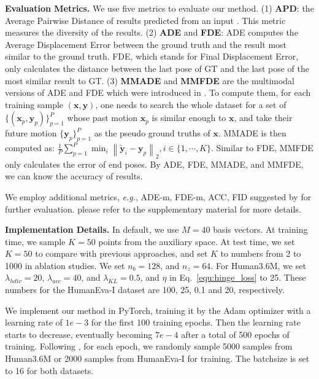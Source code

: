 \documentclass[sigconf,screen,nonacm]{acmart}
\begin{document}
	\textbf{Evaluation Metrics.} We use five metrics to evaluate our method. (1) \textbf{APD}: the Average Pairwise Distance of results predicted from an input \cite{aliakbarian2020stochastic}. This metric measures the diversity of the results. (2) \textbf{ADE} and \textbf{FDE}: ADE computes the Average Displacement Error between the ground truth and the result most similar to the ground truth. FDE, which stands for Final Displacement Error, only calculates the distance between the last pose of GT and the last pose of the most similar result to GT. (3) \textbf{MMADE} and \textbf{MMFDE} are the multimodal versions of ADE and FDE which were introduced in \cite{yuan2020dlow}. To compute them, for each training sample $(\mathbf{x},\mathbf{y})$, one needs to search the whole dataset for a set of $\{(\mathbf{x}_p,\mathbf{y}_p)\}_{p=1}^P$ whose past motion $\mathbf{x}_p$ is similar enough to $\mathbf{x}$, and take their future motion $\{\mathbf{y}_p\}_{p=1}^{P}$ as the pseudo ground truths of $\mathbf{x}$. MMADE is then computed as: $\frac{1}{P} \sum_{p=1}^{P} \min_{i} \left\|  \mathbf{\tilde{y}}_i - \mathbf{y}_p \right\|_2, i \in \{1, \cdots, K\}$. 
Similar to FDE, MMFDE only calculates the error of end poses. By ADE, FDE, MMADE, and MMFDE, we can know the accuracy of results.
	
We employ additional metrics, \textit{e.g.}, ADE-m, FDE-m, ACC, FID suggested by \cite{bie2022hit} for further evaluation. please refer to the supplementary material for more details.
	


	
	\textbf{Implementation Details.} 
In default, we use $M=40$ basis vectors. At training time, we sample $K=50$ points from the auxiliary space. At test time, we set $K=50$ to compare with previous approaches, and set $K$ to numbers from 2 to 1000 in ablation studies. We set $n_b = 128$, and $n_z = 64$. For Human3.6M, we set $\lambda_{hdiv} =20$, $\lambda_{acc}=40$, and $\lambda_{KL}=0.5$, and $\eta$ in Eq.~\ref{equ:hinge_loss} to 25. These numbers for the HumanEva-I dataset are 100, 25, 0.1 and 20, respectively. 
	
	We implement our method in PyTorch, training it by the Adam optimizer with a learning rate of $1e-3$ for the first 100 training epochs. Then the learning rate starts to decrease, eventually becoming $7e-4$ after a total of 500 epochs of training. Following \cite{yuan2020dlow,mao2021generating}, for each epoch, we randomly sample 5000 samples from Human3.6M or 2000 samples from HumanEva-I for training. The batchsize is set to 16 for both datasets.
	
\end{document}
